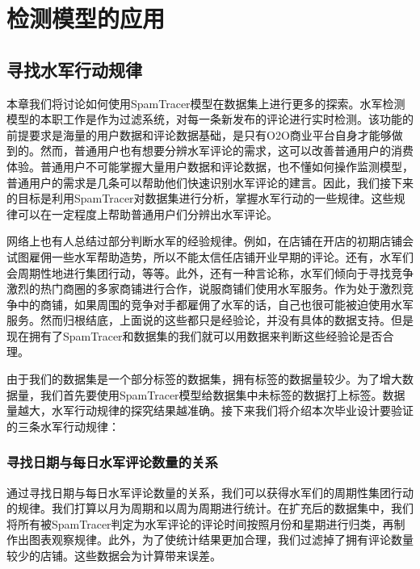 

\chapter{检测模型的应用}
\label{chap:appli}




\section{寻找水军行动规律}

本章我们将讨论如何使用SpamTracer模型在数据集上进行更多的探索。水军检测模型的本职工作是作为过滤系统，对每一条新发布的评论进行实时检测。该功能的前提要求是海量的用户数据和评论数据基础，是只有O2O商业平台自身才能够做到的。然而，普通用户也有想要分辨水军评论的需求，这可以改善普通用户的消费体验。普通用户不可能掌握大量用户数据和评论数据，也不懂如何操作监测模型，普通用户的需求是几条可以帮助他们快速识别水军评论的建言。因此，我们接下来的目标是利用SpamTracer对数据集进行分析，掌握水军行动的一些规律。这些规律可以在一定程度上帮助普通用户们分辨出水军评论。

网络上也有人总结过部分判断水军的经验规律。例如，在店铺在开店的初期店铺会试图雇佣一些水军帮助造势，所以不能太信任店铺开业早期的评论。还有，水军们会周期性地进行集团行动，等等。此外，还有一种言论称，水军们倾向于寻找竞争激烈的热门商圈的多家商铺进行合作，说服商铺们使用水军服务。作为处于激烈竞争中的商铺，如果周围的竞争对手都雇佣了水军的话，自己也很可能被迫使用水军服务。然而归根结底，上面说的这些都只是经验论，并没有具体的数据支持。但是现在拥有了SpamTracer和数据集的我们就可以用数据来判断这些经验论是否合理。

由于我们的数据集是一个部分标签的数据集，拥有标签的数据量较少。为了增大数据量，我们首先要使用SpamTracer模型给数据集中未标签的数据打上标签。数据量越大，水军行动规律的探究结果越准确。接下来我们将介绍本次毕业设计要验证的三条水军行动规律：


\subsection{寻找日期与每日水军评论数量的关系}

通过寻找日期与每日水军评论数量的关系，我们可以获得水军们的周期性集团行动的规律。我们打算以月为周期和以周为周期进行统计。在扩充后的数据集中，我们将所有被SpamTracer判定为水军评论的评论时间按照月份和星期进行归类，再制作出图表观察规律。此外，为了使统计结果更加合理，我们过滤掉了拥有评论数量较少的店铺。这些数据会为计算带来误差。



